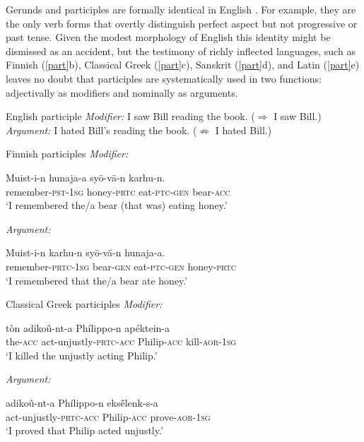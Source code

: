 \documentclass[output=paper,
modfonts
]{LSP/langsci}
\newcommand{\rfa}[2]{(\ref{#1}{#2})}
\begin{document}
Gerunds and participles are formally identical in English \citep{pullum1991,yoon1996,huddleston2002,blevins2003k}. For example, they are the only verb forms that overtly
distinguish perfect aspect but not progressive or past tense.  Given the modest morphology of
English this identity might be dismissed as an accident, but the testimony of richly inflected
languages, such as Finnish \rfa{part}{b}, Classical Greek \rfa{part}{c}, Sanskrit
\rfa{part}{d}, and Latin \rfa{part}{e} leaves no doubt that participles are systematically used
in two functions: adjectivally as modifiers and nominally as arguments.
\begin{exe}
\ex\label{part}
	\ea English  participle
		\ea \textit{Modifier:}      I saw Bill reading the book.  ($\Rightarrow$ I saw Bill.)
		\ex \textit{Argument:}        I hated Bill's reading the book.  ($\not\Rightarrow$ I hated Bill.)
		\z    
	
	\ex Finnish participles
		\ea \textit{Modifier:} 

		\gll Muist-i-n hunaja-a syö-vä-n karhu-n.\\
		 remember-\textsc{pst}-\textsc{1sg} honey-\textsc{prtc} eat-\textsc{ptc}-\textsc{gen} bear-\textsc{acc}\\
		\glt `I remembered the/a bear (that was) eating honey.' 

		\ex \textit{Argument:}
		
		\gll Muist-i-n  karhu-n  syö-vä-n hunaja-a.\\
		 remember-\textsc{prtc}-\textsc{1sg} bear-\textsc{gen} eat-\textsc{ptc}-\textsc{gen} honey-\textsc{prtc}\\
		\glt `I remembered that the/a bear ate honey.' 
		\z
		    
	\ex Classical Greek participles
		\ea \textit{Modifier:} 
 
 		\gll tòn adikoũ-nt-a Phílippo-n apéktein-a\\
		the-\textsc{acc} act-unjustly-\textsc{prtc}-\textsc{acc} Philip-\textsc{acc} kill-\textsc{aor}-\textsc{1sg}\\
		\glt `I killed the unjustly acting Philip.' 

		\ex \textit{Argument:}
		
		\gll adikoũ-nt-a Phílippo-n eksḗlenk-s-a\\
		act-unjustly-\textsc{prtc}-\textsc{acc} Philip-\textsc{acc} prove-\textsc{aor}-\textsc{1sg}\\
		\glt `I proved that Philip acted unjustly.' 
		\z    


\end{exe}
\end{document}
